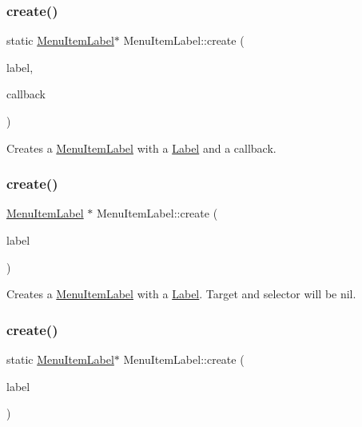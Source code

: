 \subsubsection{\texorpdfstring{create()}{create()}\hspace{0.1cm}{\footnotesize\ttfamily [4/6]}}
{\footnotesize\ttfamily static \hyperlink{classMenuItemLabel}{Menu\+Item\+Label}$\ast$ Menu\+Item\+Label\+::create (\begin{DoxyParamCaption}\item[{\hyperlink{classNode}{Node} $\ast$}]{label,  }\item[{const cc\+Menu\+Callback \&}]{callback }\end{DoxyParamCaption})\hspace{0.3cm}{\ttfamily [static]}}

Creates a \hyperlink{classMenuItemLabel}{Menu\+Item\+Label} with a \hyperlink{classLabel}{Label} and a callback. \mbox{\label{classMenuItemLabel_a1be806bb5fbf85dc8592713a740510ec}} 
\subsubsection{\texorpdfstring{create()}{create()}\hspace{0.1cm}{\footnotesize\ttfamily [5/6]}}
{\footnotesize\ttfamily \hyperlink{classMenuItemLabel}{Menu\+Item\+Label} $\ast$ Menu\+Item\+Label\+::create (\begin{DoxyParamCaption}\item[{\hyperlink{classNode}{Node} $\ast$}]{label }\end{DoxyParamCaption})\hspace{0.3cm}{\ttfamily [static]}}

Creates a \hyperlink{classMenuItemLabel}{Menu\+Item\+Label} with a \hyperlink{classLabel}{Label}. Target and selector will be nil. \mbox{\label{classMenuItemLabel_a0ff1be86dd4cf669f0eeec17358ab7bd}} 
\subsubsection{\texorpdfstring{create()}{create()}\hspace{0.1cm}{\footnotesize\ttfamily [6/6]}}
{\footnotesize\ttfamily static \hyperlink{classMenuItemLabel}{Menu\+Item\+Label}$\ast$ Menu\+Item\+Label\+::create (\begin{DoxyParamCaption}\item[{\hyperlink{classNode}{Node} $\ast$}]{label }\end{DoxyParamCaption})\hspace{0.3cm}{\ttfamily [static]}}

